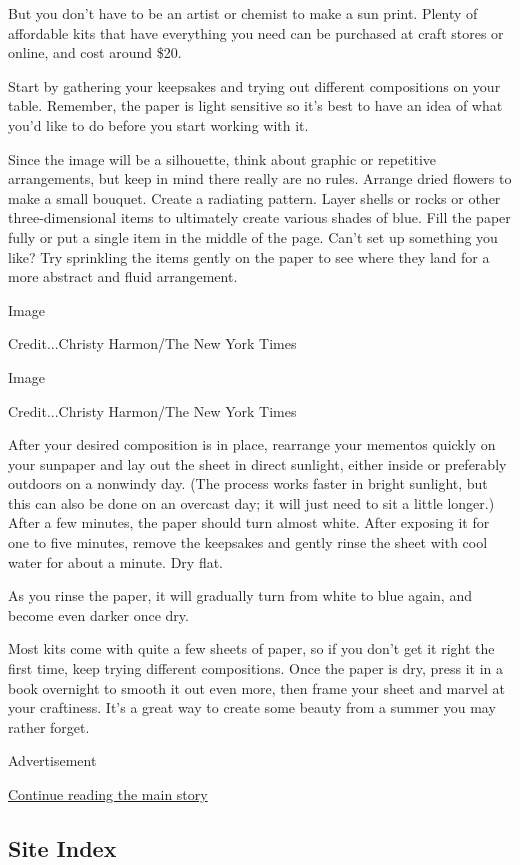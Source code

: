 But you don't have to be an artist or chemist to make a sun print.
Plenty of affordable kits that have everything you need can be purchased
at craft stores or online, and cost around \$20.

Start by gathering your keepsakes and trying out different compositions
on your table. Remember, the paper is light sensitive so it's best to
have an idea of what you'd like to do before you start working with it.

Since the image will be a silhouette, think about graphic or repetitive
arrangements, but keep in mind there really are no rules. Arrange dried
flowers to make a small bouquet. Create a radiating pattern. Layer
shells or rocks or other three-dimensional items to ultimately create
various shades of blue. Fill the paper fully or put a single item in the
middle of the page. Can't set up something you like? Try sprinkling the
items gently on the paper to see where they land for a more abstract and
fluid arrangement.

Image

Credit...Christy Harmon/The New York Times

Image

Credit...Christy Harmon/The New York Times

After your desired composition is in place, rearrange your mementos
quickly on your sunpaper and lay out the sheet in direct sunlight,
either inside or preferably outdoors on a nonwindy day. (The process
works faster in bright sunlight, but this can also be done on an
overcast day; it will just need to sit a little longer.) After a few
minutes, the paper should turn almost white. After exposing it for one
to five minutes, remove the keepsakes and gently rinse the sheet with
cool water for about a minute. Dry flat.

As you rinse the paper, it will gradually turn from white to blue again,
and become even darker once dry.

Most kits come with quite a few sheets of paper, so if you don't get it
right the first time, keep trying different compositions. Once the paper
is dry, press it in a book overnight to smooth it out even more, then
frame your sheet and marvel at your craftiness. It's a great way to
create some beauty from a summer you may rather forget.

Advertisement

\protect\hyperlink{after-bottom}{Continue reading the main story}

\hypertarget{site-index}{%
\subsection{Site Index}\label{site-index}}

